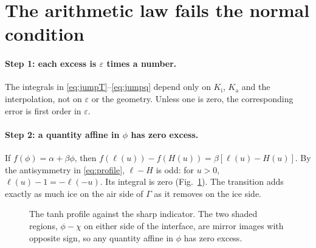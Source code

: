 \documentclass[11pt]{article}
\newcommand{\Gam}{\Gamma}
\newcommand{\Ka}{K_{\mathrm a}}
\newcommand{\Ki}{K_{\mathrm i}}
\begin{document}
\section{The arithmetic law fails the normal condition}
\label{sec:excess}

\paragraph{Step 1: each excess is $\varepsilon$ times a number.} The integrals
in \eqref{eq:jumpT}--\eqref{eq:jumpq} depend only on $\Ki$, $\Ka$ and the
interpolation, not on $\varepsilon$ or the geometry. Unless one is zero, the
corresponding error is first order in $\varepsilon$.

\paragraph{Step 2: a quantity affine in $\phi$ has zero excess.} If
$f(\phi)=\alpha+\beta\phi$, then
$f(\ell(u))-f(H(u))=\beta[\ell(u)-H(u)]$. By the antisymmetry in
\eqref{eq:profile}, $\ell-H$ is odd: for $u>0$,
$\ell(u)-1=-\ell(-u)$. Its integral is zero (Fig.~\ref{fig:lobes}). The
transition adds exactly as much ice on the air side of $\Gam$ as it removes on
the ice side.

\begin{figure}[ht]
\centering
{}
\caption{The tanh profile against the sharp indicator. The two shaded regions,
$\phi-\chi$ on either side of the interface, are mirror images with opposite
sign, so any quantity affine in $\phi$ has zero excess.}
\label{fig:lobes}
\end{figure}
\end{document}
